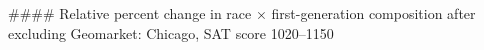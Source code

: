 #### Relative percent change in race × first-generation composition after excluding Geomarket: Chicago, SAT score 1020–1150
